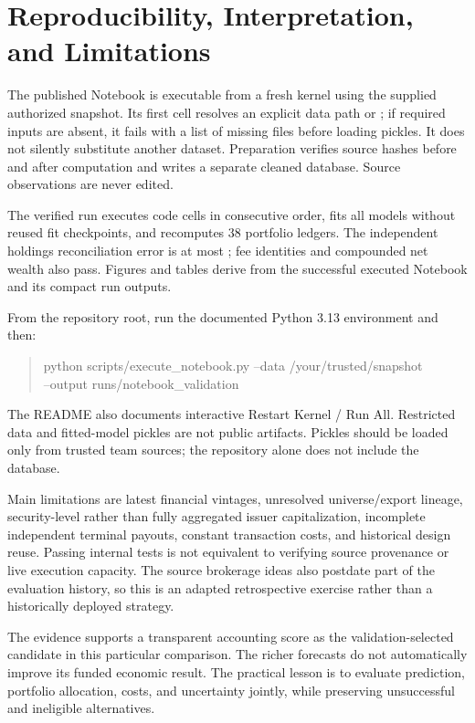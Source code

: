 \documentclass[11pt]{article}
\begin{document}
\section{Reproducibility, Interpretation, and Limitations}
The published Notebook is executable from a fresh kernel using the supplied authorized snapshot. Its first cell resolves an explicit data path or ; if required inputs are absent, it fails with a list of missing files before loading pickles. It does not silently substitute another dataset. Preparation verifies source hashes before and after computation and writes a separate cleaned database. Source observations are never edited.

The verified run executes \CodeCells{} code cells in consecutive order, fits all \FitCount{} models without reused fit checkpoints, and recomputes 38 portfolio ledgers. The independent holdings reconciliation error is at most \texttt{\LedgerError}; fee identities and compounded net wealth also pass. Figures and tables derive from the successful executed Notebook and its compact run outputs.

From the repository root, run the documented Python 3.13 environment and then:
\begin{quote}\small\ttfamily
python scripts/execute\_notebook.py --data /your/trusted/snapshot\\
\hspace*{1em}--output runs/notebook\_validation
\end{quote}
The README also documents interactive Restart Kernel / Run All. Restricted data and fitted-model pickles are not public artifacts. Pickles should be loaded only from trusted team sources; the repository alone does not include the database.

Main limitations are latest financial vintages, unresolved universe/export lineage, security-level rather than fully aggregated issuer capitalization, incomplete independent terminal payouts, constant transaction costs, and historical design reuse. Passing internal tests is not equivalent to verifying source provenance or live execution capacity. The source brokerage ideas also postdate part of the evaluation history, so this is an adapted retrospective exercise rather than a historically deployed strategy.

The evidence supports a transparent accounting score as the validation-selected candidate in this particular comparison. The richer forecasts do not automatically improve its funded economic result. The practical lesson is to evaluate prediction, portfolio allocation, costs, and uncertainty jointly, while preserving unsuccessful and ineligible alternatives.
\clearpage
\end{document}
